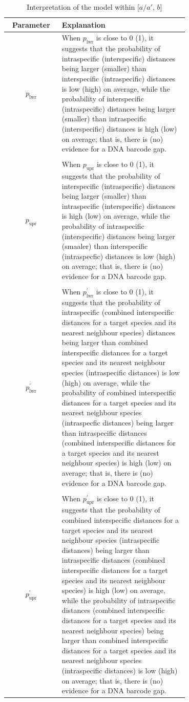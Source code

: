 \documentclass[12pt]{article}
\begin{document}
\begin{table}[htbp]
    \centering
    \small
    \caption{Interpretation of the model within [$a/a'$, $b$]}
    \label{tab:parameters}
    \begin{tabular}{cp{0.7\linewidth}}
    \hline
    \textbf{Parameter} & \textbf{Explanation} \\
    \hline
    $p_{\text{lwr}}$ & When $p_{\text{lwr}}$ is close to 0 (1), it suggests that the probability of intraspecific (interspecific) distances being larger (smaller) than interspecific (intraspecific) distances is low (high) on average, while the probability of interspecific (intraspecific) distances being larger (smaller)  than intraspecific (interspecific) distances is high (low) on average; that is, there is (no) evidence for a DNA barcode gap.\\
        & \\[-2mm]
    $p_{\text{upr}}$ & When $p_{\text{upr}}$ is close to 0 (1), it suggests that the probability of interspecific (intraspecific) distances being larger (smaller) than intraspecific (interspecific) distances is high (low) on average, while the probability of intraspecific (interspecific) distances being larger (smaaler) than interspecific (intraspecfic) distances is low (high) on average; that is, there is (no) evidence for a DNA barcode gap. \\
        & \\[-2mm]
    $p^{'}_{\text{lwr}}$ & When $p^{'}_{\text{lwr}}$ is close to 0 (1), it suggests that the probability of intraspecific (combined interspecific distances for a target species and its nearest neighbour species) distances being larger than combined interspecific distances for a target species and its nearest neighbour species (intraspecific distances) is low (high) on average, while the probability of combined interspecific distances for a target species and its nearest neighbour species (intraspecfic distances) being larger than intraspecific distances (combined interspecific distances for a target species and its nearest neighbour species) is high (low) on average; that is, there is (no) evidence for a DNA barcode gap.\\
        & \\[-2mm]
    $p^{'}_{\text{upr}}$ & When $p^{'}_{\text{upr}}$ is close to 0 (1), it suggests that the probability of combined interspecific distances for a target species and its nearest neighbour species (intraspecific distances) being larger than intraspecific distances (combined interspecific distances for a target species and its nearest neighbour species) is high (low) on average, while the probability of intraspecific distances (combined interspecific distances for a target species and its nearest neighbour species) being larger than combined interspecific distances for a target species and its nearest neighbour species (intraspecific distances) is low (high) on average; that is, there is (no) evidence for a DNA barcode gap.\\
    \hline
    \end{tabular}
\end{table}
\end{document}
